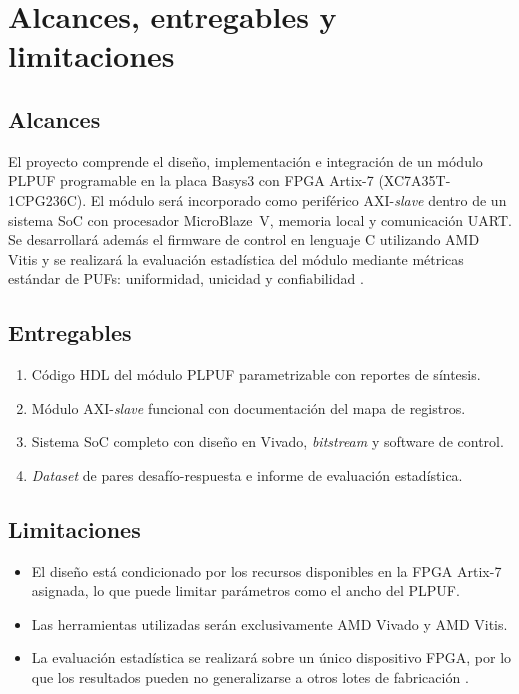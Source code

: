 \section{Alcances, entregables y limitaciones}

\subsection{Alcances}

El proyecto comprende el diseño, implementación e integración de un módulo PLPUF
programable en la placa Basys3 con FPGA Artix-7 (XC7A35T-1CPG236C). El módulo será
incorporado como periférico AXI-\textit{slave} dentro de un sistema SoC con procesador
MicroBlaze~V, memoria local y comunicación UART. Se desarrollará además el firmware de
control en lenguaje C utilizando AMD Vitis y se realizará la evaluación estadística del
módulo mediante métricas estándar de PUFs: uniformidad, unicidad y confiabilidad
\cite{maiti_2012_systematic, wilde_2020_confidence}.

\subsection{Entregables}

\begin{enumerate}
\item Código HDL del módulo PLPUF parametrizable con reportes de síntesis.
\item Módulo AXI-\textit{slave} funcional con documentación del mapa de registros.
\item Sistema SoC completo con diseño en Vivado, \textit{bitstream} y software de control.
\item \textit{Dataset} de pares desafío-respuesta e informe de evaluación estadística.
\end{enumerate}

\subsection{Limitaciones}

\begin{itemize}
\item El diseño está condicionado por los recursos disponibles en la FPGA Artix-7
asignada, lo que puede limitar parámetros como el ancho del PLPUF.

\item Las herramientas utilizadas serán exclusivamente AMD Vivado y AMD Vitis.

\item La evaluación estadística se realizará sobre un único dispositivo FPGA, por lo
que los resultados pueden no generalizarse a otros lotes de fabricación
\cite{wilde_2020_confidence}.
\end{itemize}

